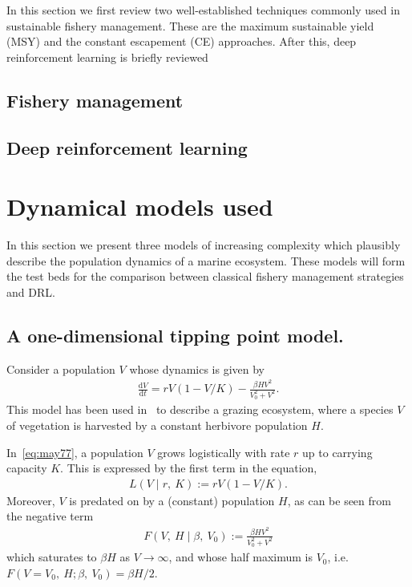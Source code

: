 \documentclass[smallextended]{svjour3}       %
\newcommand*{\der}[2]{\frac{\mathrm{d}#1}{\mathrm{d}#2}}
\def\div{\;|\;}
\begin{document}
In this section we first review two well-established techniques commonly used in sustainable fishery management. 
These are the maximum sustainable yield (MSY) and the constant escapement (CE) approaches. 
After this, deep reinforcement learning is briefly reviewed

\hypertarget{sec:2}{%
\subsection{Fishery management}\label{sec:fishery}}

\hypertarget{sec:3}{%
\subsection{Deep reinforcement learning}\label{sec:rl}}

\hypertarget{sec:4}{%
\section{Dynamical models used}\label{sec:model}}

In this section we present three models of increasing complexity which plausibly describe the population dynamics of a marine ecosystem.
These models will form the test beds for the comparison between classical fishery management strategies and DRL.

\hypertarget{sec:4.1}{%
\subsection{A one-dimensional tipping point model.}\label{p:may}}

Consider a population $V$ whose dynamics is given by
\begin{align}
  \label{eq:may77}
  \der{V}{t} = rV\left(
    1-V/K
    \right) 
    -
    \frac{\beta H V^2}{V_0^2 + V^2}. 
\end{align}
This model has been used in~\cite{may77} to describe a grazing ecosystem, where a species $V$ of vegetation is harvested by a constant herbivore population $H$. 

In~\eqref{eq:may77}, a population $V$ grows logistically with rate $r$ up to carrying capacity $K$.
This is expressed by the first term in the equation,
\begin{align*}
  L(V \div r,\ K) := rV\left(1 - V / K\right).
\end{align*}
Moreover, $V$ is predated on by a (constant) population $H$, as can be seen from the negative term
\begin{align*}
  F(V,\ H \div \beta,\ V_0) := \frac{\beta H V^2}{V_0^2 + V^2}
\end{align*}
which saturates to $\beta H$ as $V\to\infty$, and whose half maximum is $V_0$, i.e.\ $F(V=V_0,\ H; \beta,\ V_0)=\beta H/2$.
\end{document}
